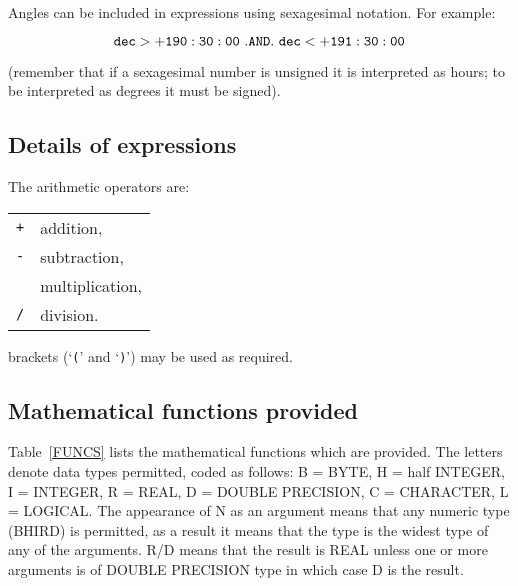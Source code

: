 \documentclass[twoside,11pt]{article}
\renewcommand{\_}{\texttt{\symbol{95}}}
\begin{document}
Angles can be included in expressions using sexagesimal notation.  For
example:

\begin{equation}
{\tt dec > +190:30:00 ~ .AND. ~ dec < +191:30:00}
\end{equation}

(remember that if a sexagesimal number is unsigned it is interpreted as
hours; to be interpreted as degrees it must be signed).

\subsection{Details of expressions}

The arithmetic operators are:

\begin{tabular}{ll}
{\tt +}  & addition,        \\
{\tt -}  & subtraction,     \\
{\tt *}  & multiplication,  \\
{\tt /}  & division.        \\
\end{tabular}

brackets (`{\tt (}' and `{\tt )}') may be used as required.


\subsection{Mathematical functions provided}

Table~\ref{FUNCS} lists the mathematical functions which are provided.
The letters denote data types permitted, coded as follows: B = BYTE,
H = half INTEGER, I = INTEGER, R = REAL, D = DOUBLE PRECISION, C =
CHARACTER, L = LOGICAL. The appearance of N as an argument means that
any numeric type (BHIRD) is permitted, as a result it means that the
type is the widest type of any of the arguments.  R/D means that the
result is REAL unless one or more arguments is of DOUBLE PRECISION
type in which case D is the result.
\end{document}

